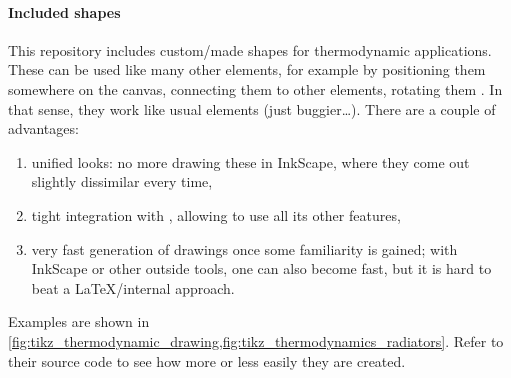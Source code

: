 \begin{figure}
{
    }
\end{figure}

\paragraph{Included shapes}
This repository includes custom\-/made shapes for thermodynamic applications.
These can be used like many other  elements, for example by
positioning them somewhere on the canvas, connecting them to other elements,
rotating them .
In that sense, they work like usual  elements (just buggier\dots{}).
There are a couple of advantages:
\begin{enumerate}
    \item unified looks: no more drawing these in InkScape, where they come out
        slightly dissimilar every time,
    \item tight integration with , allowing to use all its other
        features,
    \item very fast generation of drawings once some familiarity is gained;
        with InkScape or other outside tools, one can also become fast, but it is
        hard to beat a \LaTeX{}\-/internal approach.
\end{enumerate}
Examples are shown in
\cref{fig:tikz_thermodynamic_drawing,fig:tikz_thermodynamics_radiators}.
Refer to their source code to see how more or less easily they are created.

